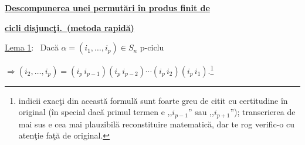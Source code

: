 \documentclass[12pt]{article}
\begin{document}
\noindent\underline{\textbf{Descompunerea unei permutări în produs finit de}}

\noindent\underline{\textbf{cicli disjuncţi.\ (metoda rapidă)}}

\bigskip
\bigskip
\noindent\underline{Lema 1}: \ Dacă $\alpha = (i_1,\ldots,i_p)\in S_n$ \quad p-ciclu

\bigskip
\noindent $\Rightarrow (i_2,\ldots,i_p) = (i_p\,i_{p-1})(i_p\,i_{p-2})\cdots(i_p\,i_2)(i_p\,i_1).$\footnote{indicii exacţi din această formulă sunt foarte greu de citit cu certitudine în original (în special dacă primul termen e ,,$i_{p-1}$'' sau ,,$i_{p+1}$''); transcrierea de mai sus e cea mai plauzibilă reconstituire matematică, dar te rog verific-o cu atenţie faţă de original.}
\end{document}
